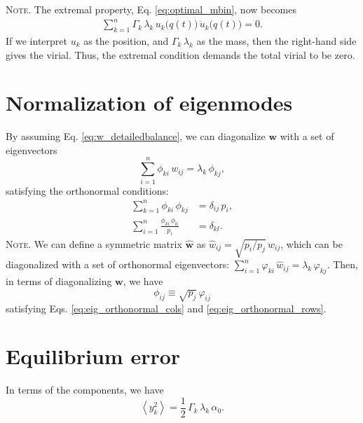 \documentclass[preprint, floatfix]{revtex4-1}
\newcommand{\note}[1]{{\color{DarkGreen}\footnotesize \textsc{Note.} #1}}
\begin{document}
\note{
  The extremal property, Eq. \eqref{eq:optimal_mbin},
  now becomes
  \begin{align}
    \sum_{k = 1}^n
      \Gamma_k \, \lambda_k \,
      u_k\bigl( q(t) \bigr) \,
      \ddot u_k\bigl( q(t) \bigr) = 0
    .
    \tag{N2}
    \label{neq:optimal_mbin1}
  \end{align}
  If we interpret $u_k$ as the position,
  and $\Gamma_k \, \lambda_k$ as the mass,
  then the right-hand side gives the virial.
  Thus, the extremal condition demands
  the total virial to be zero.
  $$\,$$
}%


\section{Normalization of eigenmodes}



By assuming Eq. \eqref{eq:w_detailedbalance},
we can diagonalize $\mathbf w$ with a set of
eigenvectors
%
\begin{equation}
  \sum_{i = 1}^n \phi_{ki} \, w_{ij}
  =
  \lambda_k \, \phi_{kj}
  ,
\label{eq:eig_w}
\end{equation}
%
satisfying the orthonormal conditions\cite{vankampen}:
%
\begin{align}
  \sum_{k = 1}^n
    \phi_{ki} \, \phi_{kj}
  &=
  \delta_{ij} \, p_i,
  \label{eq:eig_orthonormal_cols}
  \\
  \sum_{i = 1}^n
    \frac{ \phi_{ki} \, \phi_{li} }
         { p_i }
  &=
  \delta_{kl}
  .
\label{eq:eig_orthonormal_rows}
\end{align}
%
\note{We can define a symmetric matrix $\hat{\mathbf w}$
as $\hat w_{ij} = \sqrt{p_i/p_j} \, w_{ij}$,
which can be diagonalized\cite{vankampen}
with a set of orthonormal eigenvectors:
%
$\sum_{i = 1}^n \varphi_{ki} \, \hat w_{ij} = \lambda_k \, \varphi_{kj}$.
%
Then,
in terms of diagonalizing $\mathbf w$, we have
$$\phi_{ij} \equiv \sqrt{p_j} \, \varphi_{ij}$$
satisfying Eqs. \eqref{eq:eig_orthonormal_cols}
and \eqref{eq:eig_orthonormal_rows}.
%
}%


\section{Equilibrium error}


In terms of the components, we have
%
\begin{equation}
  \left\langle
    y_k^2
  \right\rangle
  =
  \frac 1 2 \, \Gamma_k \, \lambda_k \, \alpha_0.
  \label{eq:y2_eql}
\end{equation}
%
\end{document}
